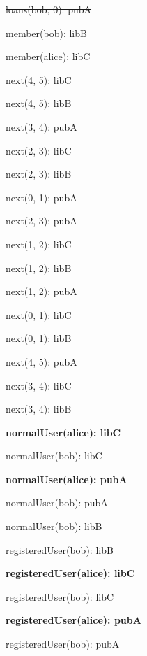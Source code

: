\documentclass{article}
\newenvironment{states}
        {\begin{minipage}{\tableWidth}\raggedright\begin{description}[align=left,leftmargin=1em,noitemsep,labelsep=\parindent]}
        {\end{description}\end{minipage}}
\begin{document}
{\begin{states}
\item{\sout{loans(\allowbreak{}bob, 0): pubA}}
\item{{member(\allowbreak{}bob): libB}}
\item{{member(\allowbreak{}alice): libC}}
\item{{next(\allowbreak{}4, 5): libC}}
\item{{next(\allowbreak{}4, 5): libB}}
\item{{next(\allowbreak{}3, 4): pubA}}
\item{{next(\allowbreak{}2, 3): libC}}
\item{{next(\allowbreak{}2, 3): libB}}
\item{{next(\allowbreak{}0, 1): pubA}}
\item{{next(\allowbreak{}2, 3): pubA}}
\item{{next(\allowbreak{}1, 2): libC}}
\item{{next(\allowbreak{}1, 2): libB}}
\item{{next(\allowbreak{}1, 2): pubA}}
\item{{next(\allowbreak{}0, 1): libC}}
\item{{next(\allowbreak{}0, 1): libB}}
\item{{next(\allowbreak{}4, 5): pubA}}
\item{{next(\allowbreak{}3, 4): libC}}
\item{{next(\allowbreak{}3, 4): libB}}
\item\textbf{{normalUser(\allowbreak{}alice): libC}}
\item{{normalUser(\allowbreak{}bob): libC}}
\item\textbf{{normalUser(\allowbreak{}alice): pubA}}
\item{{normalUser(\allowbreak{}bob): pubA}}
\item{{normalUser(\allowbreak{}bob): libB}}
\item{{registeredUser(\allowbreak{}bob): libB}}
\item\textbf{{registeredUser(\allowbreak{}alice): libC}}
\item{{registeredUser(\allowbreak{}bob): libC}}
\item\textbf{{registeredUser(\allowbreak{}alice): pubA}}
\item{{registeredUser(\allowbreak{}bob): pubA}}
\end{states}}
\end{document}
